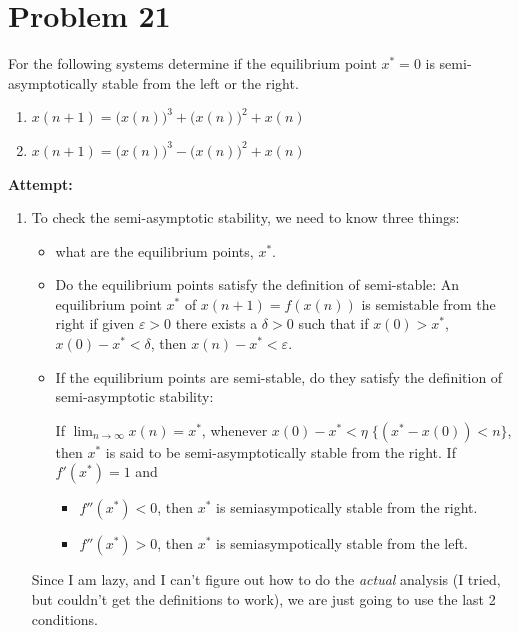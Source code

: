 \documentclass[12pt,letterpaper]{article}
\theoremstyle{definition}
\begin{document}
\section*{Problem 21}
For the following systems determine if the equilibrium point $x^*=0$ is semi-asymptotically stable from the left or the right.
\begin{enumerate}[label=(\roman*)]
    \item $\displaystyle x(n+1) = \big(x(n)\big)^3 + \big(x(n)\big)^2 + x(n)$
    \item $\displaystyle x(n+1) = \big(x(n)\big)^3 - \big(x(n)\big)^2 +x(n)$
\end{enumerate}

\textbf{Attempt:}
\begin{changemargin}{.5cm}{0cm}

\begin{enumerate}[label=(\roman*)]
    \item 
    To check the semi-asymptotic stability, we need to know three things:
    \begin{itemize}
        \item what are the equilibrium points, $x^*$.
        \item Do the equilibrium points satisfy the definition of semi-stable: 
        An equilibrium point $x^*$ of $x(n+1) = f(x(n))$ is semistable from the right if given $\varepsilon>0$ there exists a $\delta>0$ such that if $x(0)>x^*$, $x(0)-x^*<\delta$, then $x(n)-x^*<\varepsilon$. 
        
        \item If the equilibrium points are semi-stable, do they satisfy the definition of semi-asymptotic stability:
        
        If $\displaystyle \lim_{n\rightarrow \infty} x(n) = x^*$, whenever $x(0)-x^*<\eta \; \{(x^* - x(0))<n\}$, then $x^*$ is said to be semi-asymptotically stable from the right. If $f'(x^*)=1$ and 
        \begin{itemize}
            \item $f''(x^*) <0$, then $x^*$ is semiasympotically stable from the right.
            \item $f''(x^*) >0$, then $x^*$ is semiasympotically stable from the left.
        \end{itemize}
    \end{itemize}
    Since I am lazy, and I can't figure out how to do the \textit{actual} analysis (I tried, but couldn't get the definitions to work), we are just going to use the last 2 conditions.


\end{enumerate}
\end{changemargin}
\end{document}

